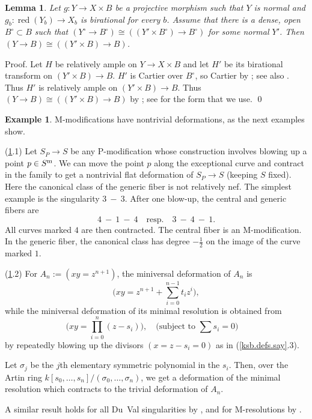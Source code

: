\documentclass{amsart}
\newtheorem{lem}[thm]{Lemma}
\theoremstyle{definition}
\newtheorem{exmp}[thm]{Example}
\theoremstyle{remark}
\newcommand{\qtq}[1]{\quad\mbox{#1}\quad}
\newcommand{\red}[0]{\operatorname{red}}
\newcommand{\tsum}[0]{\textstyle{\sum}}
\newcommand{\tprod}[0]{\textstyle{\prod}}
\begin{document}
\begin{lem} \label{rigid.quot.mod.lem.2}
  Let $g:Y\to X\times B$ be a projective morphism such that
  $Y$ is normal and 
  $g_b:\red (Y_b)\to X_b$ is birational for every $b$.
  Assume that there is a dense, open $B^\circ\subset B$ such that
  $(Y^\circ\to B^\circ)\cong ((Y'\times B^\circ)\to B^\circ)$ for some
  normal $Y'$. Then $(Y\to B)\cong ((Y'\times B)\to B)$.
\end{lem}

Proof. Let $H$ be relatively ample on $Y\to X\times B$ and let $H'$ be its
birational  transform on $(Y'\times B)\to B$.
$H'$ is Cartier over $B^\circ$, so Cartier by \cite{ram-sam, sam-ram}; see also
\cite[4.21]{k-modbook}.
Thus $H'$ is relatively ample on $(Y'\times B)\to B$.
Thus $(Y\to B)\cong ((Y'\times B)\to B)$
 by   \cite{mats-mumf}; see \cite[11.39]{k-modbook} for the form that we use.  \qed 
 

 \begin{exmp}\label{An.mines.exmp} M-modifications have nontrivial deformations, as
   the next examples show.

   (\ref{An.mines.exmp}.1)  Let $S_P\to S$ be any P-modification whose construction involves blowing up a point  $p\in S^{\rm m}$. We can move the point
   $p$ along the exceptional curve and contract in the family to get a
   nontrivial flat deformation of $S_P\to S$ (keeping $S$ fixed).
   Here the canonical class of the generic fiber is not relatively nef.
   The simplest example is  the singularity $3\ -\ 3$. After one blow-up, the central and generic fibers are
   $$
   4\ -\ 1\ -\ 4 \qtq{resp.}   3\ -\ 4\ -\ 1.
   $$
   All curves marked $4$ are then contracted. The central fiber is an 
   M-modification. In the generic fiber, the canonical class has degree $-\frac12$ on the image of the
   curve marked $1$. 
   
    (\ref{An.mines.exmp}.2) For $A_n:=(xy=z^{n+1})$, the miniversal deformation of $A_n$ is
   $$
   \bigl(xy=z^{n+1}+\tsum_{i=0}^{n-1}t_iz^i\bigr),
   $$
   while the  miniversal deformation  of its minimal  resolution  is  obtained from 
   $$
   \bigl(xy=\tprod_{i=0}^{n}(z-s_i)\bigr), \qtq{(subject to $\tsum s_i=0$)}
   $$
   by  repeatedly blowing up the divisors $(x=z-s_i=0)$ as in (\ref{ksb.defs.say}.3).
   
   Let $\sigma_j$ be the $j$th elementary symmetric polynomial in the $s_i$.
   Then, over the Artin ring  $k[s_0,\dots, s_n]/(\sigma_0, \dots, \sigma_n)$, we get
   a   deformation  of the minimal  resolution which contracts to the
   trivial deformation of  $A_n$.

   A similar result holds for all  Du~Val singularities by \cite{art-bri},
   and for M-resolutions by \cite{be-ch}.
   \end{exmp}
\end{document}
